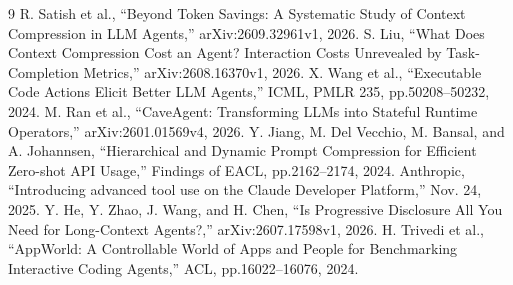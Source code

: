\documentclass[uplatex,a4paper,twocolumn,10pt]{jsarticle}
\begin{document}
\begin{thebibliography}{9}\small
{} R. Satish et al., ``Beyond Token Savings: A Systematic Study of Context Compression in LLM Agents,'' arXiv:2609.32961v1, 2026.
 S. Liu, ``What Does Context Compression Cost an Agent? Interaction Costs Unrevealed by Task-Completion Metrics,'' arXiv:2608.16370v1, 2026.
 X. Wang et al., ``Executable Code Actions Elicit Better LLM Agents,'' ICML, PMLR 235, pp.50208--50232, 2024.
 M. Ran et al., ``CaveAgent: Transforming LLMs into Stateful Runtime Operators,'' arXiv:2601.01569v4, 2026.
 Y. Jiang, M. Del Vecchio, M. Bansal, and A. Johannsen, ``Hierarchical and Dynamic Prompt Compression for Efficient Zero-shot API Usage,'' Findings of EACL, pp.2162--2174, 2024.
 Anthropic, ``Introducing advanced tool use on the Claude Developer Platform,'' Nov. 24, 2025.
 Y. He, Y. Zhao, J. Wang, and H. Chen, ``Is Progressive Disclosure All You Need for Long-Context Agents?,'' arXiv:2607.17598v1, 2026.
 H. Trivedi et al., ``AppWorld: A Controllable World of Apps and People for Benchmarking Interactive Coding Agents,'' ACL, pp.16022--16076, 2024.
\end{thebibliography}
\end{document}
